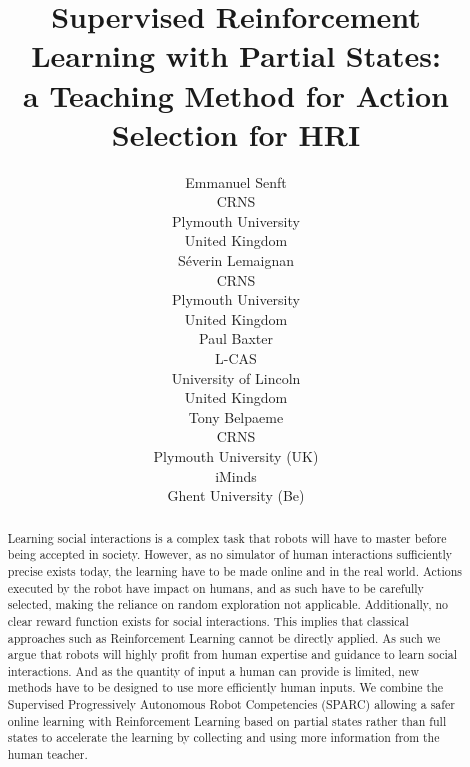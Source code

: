 \documentclass[letterpaper]{article} %
\begin{document}
%
\title{Supervised Reinforcement Learning with Partial States: \\
 a Teaching Method for Action Selection for HRI}

\author{Emmanuel Senft \\
CRNS \\
Plymouth University \\
United Kingdom\\
\And S\'{e}verin Lemaignan\\
CRNS \\
Plymouth University \\
United Kingdom\\
\And Paul Baxter\\
L-CAS\\
University of Lincoln\\
United Kingdom\\
 \And Tony Belpaeme\\
 CRNS\\ Plymouth University (UK) \\ iMinds \\ Ghent University (Be)}

\maketitle
\begin{abstract}
    Learning social interactions is a complex task that robots will have to
    master before being accepted in society. However, as no simulator of human
    interactions sufficiently
    precise exists today, the learning have to be made online and in the real
    world. Actions executed by the robot have impact on humans, and as such
    have to be carefully selected, making the reliance on random exploration not
    applicable. Additionally, no clear reward function exists for
    social interactions. This implies that classical approaches such as
    Reinforcement Learning cannot be directly applied. As such we argue that
    robots will highly profit from human expertise and guidance to learn social
    interactions. And as the quantity of input a human can provide is limited,
    new methods have to be designed to use more efficiently human inputs. We
    combine the Supervised Progressively Autonomous Robot Competencies (SPARC)
    allowing a safer online learning with Reinforcement Learning based on
    partial states rather than full states to accelerate the learning by
    collecting and using more information from the human teacher.
\end{abstract}
\end{document}
